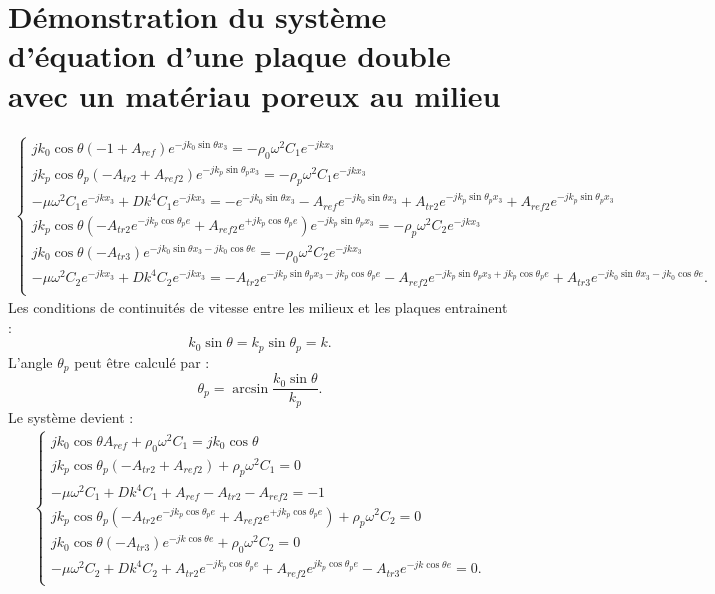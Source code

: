 \documentclass[12pt,foolscap]{report}
\begin{document}
	\chapter{Démonstration du système d'équation d'une plaque double avec un matériau poreux au milieu }
	\label{ch:demoporeux}
	\begin{align}
	\begin{cases}
	j k_0 \cos\theta (-1+A_{ref}) e^{-jk_0\sin\theta x_3} = -\rho_0\omega^2 C_{1}e^{-jkx_3}\\
	j k_p \cos\theta_p (-A_{tr2}+A_{ref2}) e^{-jk_p\sin\theta_p x_3} = -\rho_p\omega^2 C_{1}e^{-jkx_3}\\
	-\mu \omega^2C_{1}e^{-jkx_3}+Dk^4C_{1}e^{-jkx_3} = -e^{-jk_0\sin\theta x_3}-A_{ref}e^{-jk_0\sin\theta x_3}+A_{tr2}e^{-jk_p\sin\theta_p x_3}+A_{ref2}e^{-jk_p\sin\theta_p x_3}\\
	j k_p \cos\theta (-A_{tr2}e^{-jk_p\cos\theta_p e}+A_{ref2}e^{+jk_p\cos\theta_p e})e^{-jk_p\sin\theta_p x_3}  = -\rho_p\omega^2 C_{2}e^{-jkx_3}\\
	j k_0\cos\theta (-A_{tr3}) e^{-jk_0\sin\theta x_3-jk_0\cos\theta e} = -\rho_0\omega^2 C_{2}e^{-jkx_3}\\
	-\mu \omega^2C_{2}e^{-jkx_3}+Dk^4C_{2}e^{-jkx_3} = -A_{tr2}e^{-jk_p\sin\theta_p x_3-jk_p\cos\theta_p e}-A_{ref2}e^{-jk_p\sin\theta_p x_3+jk_p\cos\theta_p e}+A_{tr3}e^{-jk_0\sin\theta x_3-jk_0\cos\theta e}\text{.}\\
	\end{cases}
	\end{align}
	Les conditions de continuités de vitesse entre les milieux et les plaques entrainent : 
	\begin{equation}
	k_0 \sin\theta = k_p \sin\theta_p =k\text{.}
	\end{equation}
	L'angle $\theta_p$ peut être calculé par :
	\begin{equation}
	\theta_p = \arcsin\frac{k_0 \sin\theta}{k_p} \text{.}
	\end{equation}
	Le système devient : 
	\begin{align}
	\begin{cases}
	j k_0 \cos\theta A_{ref}  +\rho_0\omega^2 C_{1}=j k_0 \cos\theta \\
	j k_p \cos\theta_p (-A_{tr2}+A_{ref2})  +\rho_p\omega^2 C_{1}=0\\
	-\mu \omega^2C_{1}+Dk^4C_{1} +A_{ref} -A_{tr2}-A_{ref2} = -1\\
	j k_p \cos\theta_p (-A_{tr2}e^{-jk_p\cos\theta_p e}+A_{ref2}e^{+jk_p\cos\theta_p e}) +\rho_p\omega^2 C_{2} =0\\
	j k_0 \cos\theta (-A_{tr3}) e^{-jk\cos\theta e} +\rho_0\omega^2 C_{2}=0\\
	-\mu \omega^2C_{2}+Dk^4C_{2} +A_{tr2}e^{-jk_p\cos\theta_p e}+A_{ref2}e^{jk_p\cos\theta_p e}-A_{tr3}e^{-jk\cos\theta e}=0 \text{.}\\
	\end{cases}
	\end{align}
	
\end{document}
